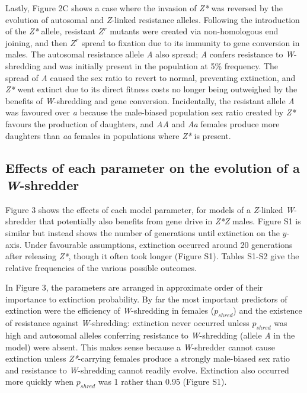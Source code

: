 \documentclass[]{rsos}%
\begin{document}
Lastly, Figure 2C shows a case where the invasion of \emph{Z*} was
reversed by the evolution of autosomal and \emph{Z}-linked resistance
alleles. Following the introduction of the \emph{Z*} allele, resistant
\(Z^r\) mutants were created via non-homologous end joining, and then
\(Z^r\) spread to fixation due to its immunity to gene conversion in
males. The autosomal resistance allele \emph{A} also spread; \emph{A}
confers resistance to \emph{W}-shredding and was initially present in
the population at 5\% frequency. The spread of \emph{A} caused the sex
ratio to revert to normal, preventing extinction, and \emph{Z*} went
extinct due to its direct fitness costs no longer being outweighed by
the benefits of \emph{W}-shredding and gene conversion. Incidentally,
the resistant allele \emph{A} was favoured over \emph{a} because the
male-biased population sex ratio created by \emph{Z*} favours the
production of daughters, and \emph{AA} and \emph{Aa} females produce
more daughters than \emph{aa} females in populations where \emph{Z*} is
present.

\hypertarget{effects-of-each-parameter-on-the-evolution-of-a-w-shredder}{%
\subsection{\texorpdfstring{Effects of each parameter on the evolution
of a
\emph{W}-shredder}{Effects of each parameter on the evolution of a W-shredder}}\label{effects-of-each-parameter-on-the-evolution-of-a-w-shredder}}

Figure 3 shows the effects of each model parameter, for models of a
\emph{Z}-linked \emph{W}-shredder that potentially also benefits from
gene drive in \emph{Z*Z} males. Figure S1 is similar but instead shows
the number of generations until extinction on the \(y\)-axis. Under
favourable assumptions, extinction occurred around 20 generations after
releasing \emph{Z*}, though it often took longer (Figure S1). Tables
S1-S2 give the relative frequencies of the various possible outcomes.

In Figure 3, the parameters are arranged in approximate order of their
importance to extinction probability. By far the most important
predictors of extinction were the efficiency of \emph{W}-shredding in
females (\(p_{shred}\)) and the existence of resistance against
\emph{W}-shredding: extinction never occurred unless \(p_{shred}\) was
high and autosomal alleles conferring resistance to \emph{W}-shredding
(allele \emph{A} in the model) were absent. This makes sense because a
\emph{W}-shredder cannot cause extinction unless \emph{Z*}-carrying
females produce a strongly male-biased sex ratio and resistance to
\emph{W}-shredding cannot readily evolve. Extinction also occurred more
quickly when \(p_{shred}\) was 1 rather than 0.95 (Figure S1).
\end{document}

